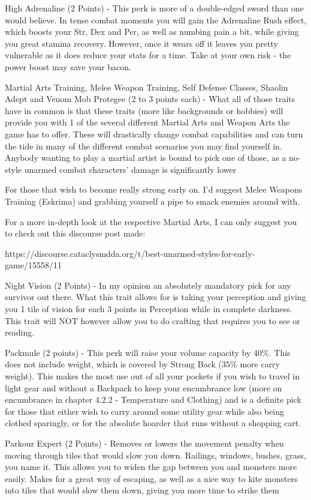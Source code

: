\documentclass[11pt]{report}
\begin{document}
High Adrenaline (2 Points) - This perk is more of a double-edged sword than one would believe. In tense combat moments you will gain the Adrenaline Rush effect, which boosts your Str, Dex and Per, as well as numbing pain a bit, while giving you great stamina recovery. However, once it wears off it leaves you pretty vulnerable as it does reduce your stats for a time. Take at your own risk - the power boost may save your bacon.

Martial Arts Training, Melee Weapon Training, Self Defense Classes, Shaolin Adept and Venom Mob Protegee (2 to 3 points each) - What all of those traits have in common is that these traits (more like backgrounds or hobbies) will provide you with 1 of the several different Martial Arts and Weapon Arts the game has to offer. These will drastically change combat capabilities and can turn the tide in many of the different combat scenarios you may find yourself in. Anybody wanting to play a martial artist is bound to pick one of those, as a no-style unarmed combat characters' damage is significantly lower

For those that wish to become really strong early on. I'd suggest Melee Weapons Training (Eskrima) and grabbing yourself a pipe to smack enemies around with.

For a more in-depth look at the respective Martial Arts, I can only suggest you to check out this discourse post made:

https://discourse.cataclysmdda.org/t/best-unarmed-styles-for-early-game/15558/11

Night Vision (2 Points) - In my opinion an absolutely mandatory pick for any survivor out there. What this trait allows for is taking your perception and giving you 1 tile of vision for each 3 points in Perception while in complete darkness. This trait will NOT however allow you to do crafting that requires you to see or reading.

Packmule (2 points) - This perk will raise your volume capacity by 40\%. This does not include weight, which is covered by Strong Back (35\% more carry weight). This makes the most use out of all your pockets if you wish to travel in light gear and without a Backpack to keep your encumbrance low (more on encumbrance in chapter 4.2.2 - Temperature and Clothing) and is a definite pick for those that either wish to carry around some utility gear while also being clothed sparingly, or for the absolute hoarder that runs without a shopping cart.

Parkour Expert (2 Points) - Removes or lowers the movement penalty when moving through tiles that would slow you down. Railings, windows, bushes, grass, you name it. This allows you to widen the gap between you and monsters more easily. Makes for a great way of escaping, as well as a nice way to kite monsters into tiles that would slow them down, giving you more time to strike them
\end{document}
